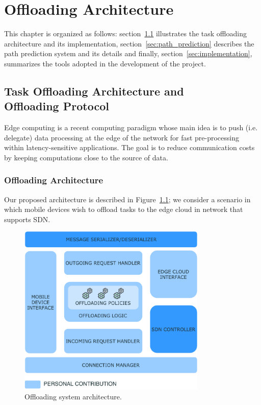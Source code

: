 \chapter{Offloading Architecture}
\label{ch:contribution}

This chapter is organized as follows: section~\ref{sec:task_off} illustrates the task offloading architecture and its implementation, section~\ref{sec:path_prediction} describes the path prediction system and its details and finally, section~\ref{sec:implementation}, summarizes the tools adopted in the development of the project.

\section{Task Offloading Architecture and~\\Offloading Protocol}
\label{sec:task_off}
Edge computing is a recent computing paradigm whose main idea is to push (i.e. delegate) data processing at the edge of the network for fast pre-processing within latency-sensitive applications. The goal is to reduce communication costs by keeping computations close to the source of data. 

\subsection{Offloading Architecture}
\label{sec:architecture}
Our proposed architecture is described in Figure~\ref{fig:offloading_system_arch}; we consider a scenario in which mobile devices wish to offload tasks to the edge cloud in network that supports SDN.

\begin{figure}
\centering
\includegraphics[width=0.8\textwidth]{img/off_sys_arch}
\caption{Offloading system architecture.}
\label{fig:offloading_system_arch}
\end{figure}

